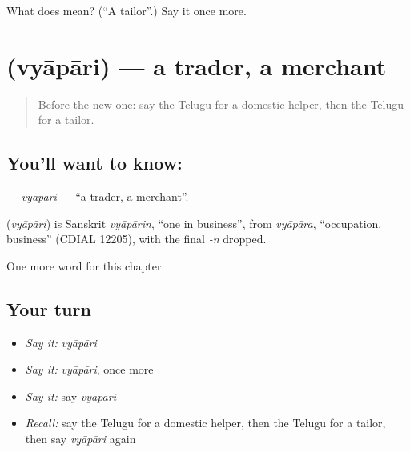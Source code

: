 \begin{tcolorbox}[breakable,colback=teal!4,colframe=teal!35!black,title={Before you move on}]
What does  mean? (\textquotedblleft{}A tailor\textquotedblright{}.) Say it once more.
\end{tcolorbox}
\section[\texorpdfstring{\te{వ్యాపారి} (vyāpāri)}{వ్యాపారి (vyāpāri)}]{ (vyāpāri) — a trader, a merchant}

\label{lesson:TE-C194-vyapari}



\begin{quote}
Before the new one: say the Telugu for a domestic helper, then the Telugu for a tailor.
\end{quote}

\subsection*{You'll want to know: }
\textbf{} — \emph{vyāpāri} — \textquotedblleft{}a trader, a merchant\textquotedblright{}.

\begin{cousinweb}
\textbf{} (\emph{vyāpāri}) is Sanskrit \emph{vyāpārin}, \textquotedblleft{}one in business\textquotedblright{}, from \emph{vyāpāra}, \textquotedblleft{}occupation, business\textquotedblright{} (CDIAL 12205), with the final \emph{-n} dropped.
\end{cousinweb}

\begin{grammarlens}[title={What you've built}]
One more word for this chapter.
\end{grammarlens}

\subsection*{Your turn}
\begin{itemize}
\raggedright
  \item \emph{Say it:} \emph{vyāpāri}
  \item \emph{Say it:} \emph{vyāpāri}, once more
  \item \emph{Say it:} say \emph{vyāpāri}
  \item \emph{Recall:} say the Telugu for a domestic helper, then the Telugu for a tailor, then say \emph{vyāpāri} again
\end{itemize}

